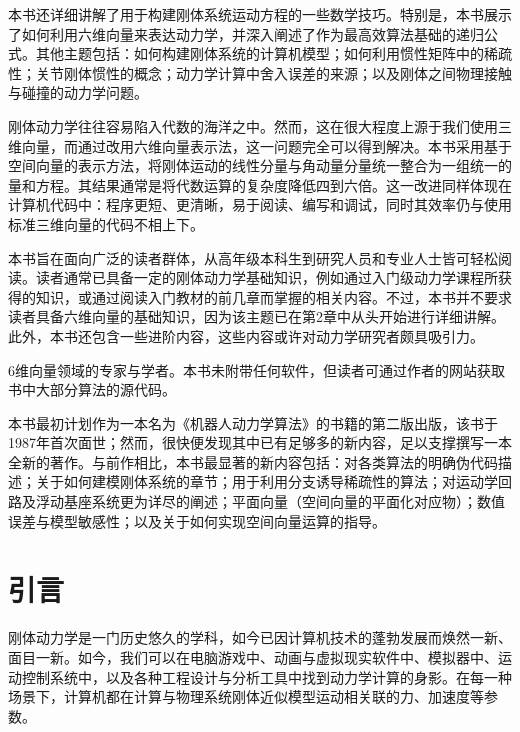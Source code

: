\documentclass[10pt,a4paper]{book}
\theoremstyle{thmstyle} %
\theoremstyle{defstyle} %
\theoremstyle{prostyle} %
\begin{document}
本书还详细讲解了用于构建刚体系统运动方程的一些数学技巧。特别是，本书展示了如何利用六维向量来表达动力学，并深入阐述了作为最高效算法基础的递归公式。其他主题包括：如何构建刚体系统的计算机模型；如何利用惯性矩阵中的稀疏性；关节刚体惯性的概念；动力学计算中舍入误差的来源；以及刚体之间物理接触与碰撞的动力学问题。



刚体动力学往往容易陷入代数的海洋之中。然而，这在很大程度上源于我们使用三维向量，而通过改用六维向量表示法，这一问题完全可以得到解决。本书采用基于空间向量的表示方法，将刚体运动的线性分量与角动量分量统一整合为一组统一的量和方程。其结果通常是将代数运算的复杂度降低四到六倍。这一改进同样体现在计算机代码中：程序更短、更清晰，易于阅读、编写和调试，同时其效率仍与使用标准三维向量的代码不相上下。



本书旨在面向广泛的读者群体，从高年级本科生到研究人员和专业人士皆可轻松阅读。读者通常已具备一定的刚体动力学基础知识，例如通过入门级动力学课程所获得的知识，或通过阅读入门教材的前几章而掌握的相关内容。不过，本书并不要求读者具备六维向量的基础知识，因为该主题已在第2章中从头开始进行详细讲解。此外，本书还包含一些进阶内容，这些内容或许对动力学研究者颇具吸引力。



6维向量领域的专家与学者。本书未附带任何软件，但读者可通过作者的网站获取书中大部分算法的源代码。



本书最初计划作为一本名为《机器人动力学算法》的书籍的第二版出版，该书于1987年首次面世；然而，很快便发现其中已有足够多的新内容，足以支撑撰写一本全新的著作。与前作相比，本书最显著的新内容包括：对各类算法的明确伪代码描述；关于如何建模刚体系统的章节；用于利用分支诱导稀疏性的算法；对运动学回路及浮动基座系统更为详尽的阐述；平面向量（空间向量的平面化对应物）；数值误差与模型敏感性；以及关于如何实现空间向量运算的指导。



\chapter{引言}







刚体动力学是一门历史悠久的学科，如今已因计算机技术的蓬勃发展而焕然一新、面目一新。如今，我们可以在电脑游戏中、动画与虚拟现实软件中、模拟器中、运动控制系统中，以及各种工程设计与分析工具中找到动力学计算的身影。在每一种场景下，计算机都在计算与物理系统刚体近似模型运动相关联的力、加速度等参数。
\end{document}
